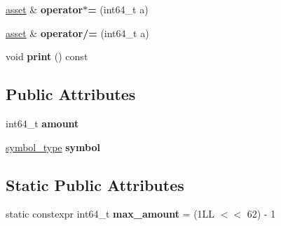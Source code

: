 \begin{DoxyCompactItemize}
\item 
\mbox{\label{structaacio_1_1asset_a9cba297ce327f1b7e72d2583f7b3ac8f}} 
\mbox{\hyperlink{structaacio_1_1asset}{asset}} \& {\bfseries operator$\ast$=} (int64\+\_\+t a)
\item 
\mbox{\label{structaacio_1_1asset_a1daa11321a5b8fee8add5218191e792f}} 
\mbox{\hyperlink{structaacio_1_1asset}{asset}} \& {\bfseries operator/=} (int64\+\_\+t a)
\item 
\mbox{\label{structaacio_1_1asset_aae07f2ecb754d21719fd3404b7be51ed}} 
void {\bfseries print} () const
\end{DoxyCompactItemize}
\subsection*{Public Attributes}
\begin{DoxyCompactItemize}
\item 
\mbox{\label{structaacio_1_1asset_a11190b8e82dfc541a7ce2cd49d160666}} 
int64\+\_\+t {\bfseries amount}
\item 
\mbox{\label{structaacio_1_1asset_a813ed5e3f614c5283eddb32a5707cd5f}} 
\mbox{\hyperlink{structaacio_1_1symbol__type}{symbol\+\_\+type}} {\bfseries symbol}
\end{DoxyCompactItemize}
\subsection*{Static Public Attributes}
\begin{DoxyCompactItemize}
\item 
\mbox{\label{structaacio_1_1asset_af57ee298513e13a98c8d035d4876a640}} 
static constexpr int64\+\_\+t {\bfseries max\+\_\+amount} = (1\+L\+L $<$$<$ 62) -\/ 1
\end{DoxyCompactItemize}
